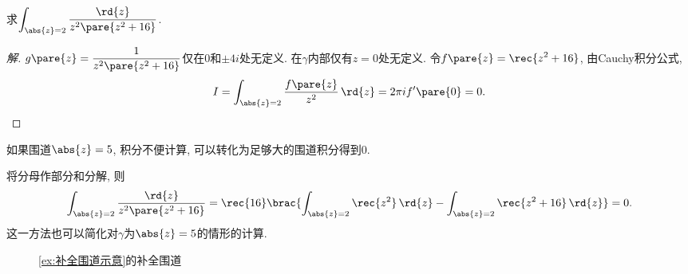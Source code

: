 \documentclass{ctexart}
\begin{document}
\begin{sample}
    \begin{ex}
        求$\displaystyle \int_{\abs{z}=2} \frac{\rd{z}}{z^2\pare{z^2+16}}$.
    \end{ex}
    \begin{proof}[解]
        $\displaystyle g\pare{z} = \frac{1}{z^2\pare{z^2+16}}$仅在$0$和$\pm 4i$处无定义. 在$\gamma$内部仅有$z=0$处无定义. 令$f\pare{z} = \displaystyle \rec{z^2+16}$, 由Cauchy积分公式,
        \[ I = \int_{\abs{z} = 2} \frac{f\pare{z}}{z^2}\,\rd{z} = 2\pi i f'\pare{0} = 0. \qedhere \]
    \end{proof}
\end{sample}
\begin{remark}
    如果围道$\abs{z}=5$, 积分不便计算, 可以转化为足够大的围道积分得到$0$.
\end{remark}
\begin{remark}
    将分母作部分和分解, 则
    \[ \int_{\abs{z} = 2} \frac{\rd{z}}{z^2\pare{z^2+16}} = \rec{16} \brac{\int_{\abs{z}=2} \rec{z^2}\,\rd{z} - \int_{\abs{z}=2} \rec{z^2+16}\,\rd{z}} = 0. \]
    这一方法也可以简化对$\gamma$为$\abs{z}=5$的情形的计算.
\end{remark}
\begin{figure}
    \centering
    \caption{\cref{ex:补全围道示意}的补全围道}
    \label{fig:补全围道1}
\end{figure}
\end{document}
